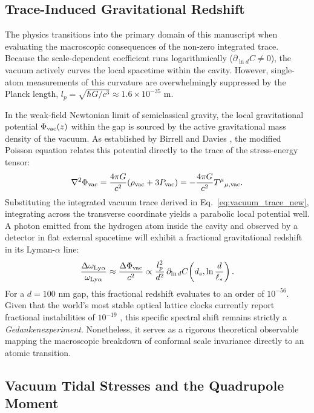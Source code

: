 \documentclass[12pt,letterpaper]{article}
\begin{document}
\subsection{Trace-Induced Gravitational Redshift}

The physics transitions into the primary domain of this manuscript when evaluating the macroscopic consequences of the non-zero integrated trace. Because the scale-dependent coefficient runs logarithmically ($\partial_{\ln d}C \neq 0$), the vacuum actively curves the local spacetime within the cavity. However, single-atom measurements of this curvature are overwhelmingly suppressed by the Planck length, $l_p = \sqrt{\hbar G/c^3} \approx 1.6 \times 10^{-35}$ m.

In the weak-field Newtonian limit of semiclassical gravity, the local gravitational potential $\Phi_{\rm vac}(z)$ within the gap is sourced by the active gravitational mass density of the vacuum. As established by Birrell and Davies \cite{birrelldavies1982}, the modified Poisson equation relates this potential directly to the trace of the stress-energy tensor:
\begin{equation}
\nabla^2 \Phi_{\rm vac} = \frac{4\pi G}{c^2} (\rho_{\rm vac} + 3P_{\rm vac}) = -\frac{4\pi G}{c^2} T^\mu{}_{\mu, \rm vac}.
\label{eq:Poisson_trace}
\end{equation}
Substituting the integrated vacuum trace derived in Eq.~\eqref{eq:vacuum_trace_new}, integrating across the transverse coordinate yields a parabolic local potential well. A photon emitted from the hydrogen atom inside the cavity and observed by a detector in flat external spacetime will exhibit a fractional gravitational redshift in its Lyman-$\alpha$ line:
\begin{equation}
\frac{\Delta \omega_{{\rm Ly}\alpha}}{\omega_{{\rm Ly}\alpha}} \approx \frac{\Delta \Phi_{\rm vac}}{c^2} \propto \frac{l_p^2}{d^2} \, \partial_{\ln d}C\!\left(d_s,\ln\frac{d}{\ell_*}\right).
\label{eq:Lyman_redshift}
\end{equation}
For a $d = 100$ nm gap, this fractional redshift evaluates to an order of $10^{-56}$. Given that the world's most stable optical lattice clocks currently report fractional instabilities of $10^{-19}$ \cite{brewer2019}, this specific spectral shift remains strictly a \emph{Gedankenexperiment}. Nonetheless, it serves as a rigorous theoretical observable mapping the macroscopic breakdown of conformal scale invariance directly to an atomic transition.

\subsection{Vacuum Tidal Stresses and the Quadrupole Moment}
\end{document}

